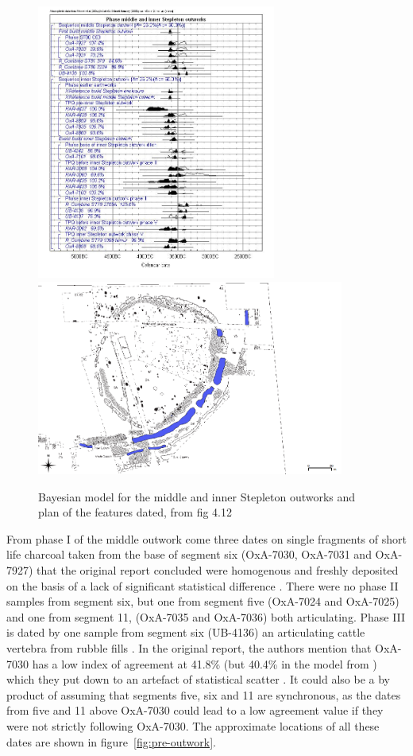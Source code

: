 \begin{figure}
\centering
	\includegraphics[width=0.7\textwidth]{figures/model5}
	\includegraphics[width=0.9\textwidth]{figures/model5-plan}
  \caption{Bayesian model for the middle and inner Stepleton outworks and plan of the features dated, from fig 4.12 \citep[143]{Whittle:2011kl}}
  \label{fig:stepleton2}
\end{figure}

From phase I of the middle outwork come three dates on single fragments of short life charcoal taken from the base of segment six (OxA-7030, OxA-7031 and OxA-7927) that the original report concluded were homogenous and freshly deposited on the basis of a lack of significant statistical difference \cite[395]{Mercer:2008fk}. There were no phase II samples from segment six, but one from segment five (OxA-7024 and OxA-7025) and one from segment 11, (OxA-7035 and OxA-7036) both articulating. Phase III is dated by one sample from segment six (UB-4136) an articulating cattle vertebra from rubble fills \cite[395]{Mercer:2008fk}. In the original report, the authors mention that OxA-7030 has a low index of agreement at 41.8\% (but 40.4\% in the model from \citealp{Whittle:2011kl}) which they put down to an artefact of statistical scatter \cite[395]{Mercer:2008fk}. It could also be a by product of assuming that segments five, six and 11 are synchronous, as the dates from five and 11 above OxA-7030 could lead to a low agreement value if they were not strictly following OxA-7030. The approximate locations of all these dates are shown in figure~\ref{fig:pre-outwork}.

